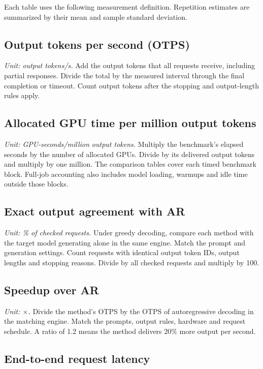 Each table uses the following measurement definition. Repetition estimates are summarized by their mean and sample standard deviation.

\subsection{Output tokens per second (OTPS)}

\textit{Unit: output tokens/s.} Add the output tokens that all requests receive, including partial responses. Divide the total by the measured interval through the final completion or timeout. Count output tokens after the stopping and output-length rules apply.

\subsection{Allocated GPU time per million output tokens}

\textit{Unit: GPU-seconds/million output tokens.} Multiply the benchmark's elapsed seconds by the number of allocated GPUs. Divide by its delivered output tokens and multiply by one million. The comparison tables cover each timed benchmark block. Full-job accounting also includes model loading, warmups and idle time outside those blocks.

\subsection{Exact output agreement with AR}

\textit{Unit: \% of checked requests.} Under greedy decoding, compare each method with the target model generating alone in the same engine. Match the prompt and generation settings. Count requests with identical output token IDs, output lengths and stopping reasons. Divide by all checked requests and multiply by 100.

\subsection{Speedup over AR}

\textit{Unit: \(\times\).} Divide the method's OTPS by the OTPS of autoregressive decoding in the matching engine. Match the prompts, output rules, hardware and request schedule. A ratio of 1.2 means the method delivers 20\% more output per second.

\subsection{End-to-end request latency}


